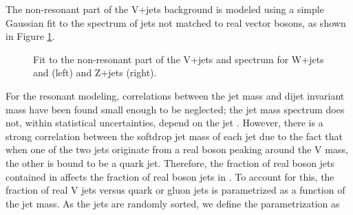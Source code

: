 The non-resonant part of the V+jets background is modeled using a simple Gaussian fit to the spectrum of jets not matched to real vector bosons, as shown in Figure \ref{fig:Vjets_fits_nonRes}.
\begin{figure}[h!]
\centering
{}
\caption{Fit to the non-resonant part of the V+jets and \ttbar spectrum for W+jets and \ttbar (left) and Z+jets (right).}
\label{fig:Vjets_fits_nonRes}
\end{figure}
For the resonant modeling, correlations between the jet mass \MJ and dijet invariant mass \MVV have been found small enough to be neglected; the jet mass spectrum does not, within statistical uncertainties, depend on the jet \PT. However, there is a strong correlation between the softdrop jet mass of each jet due to the fact that when one of the two jets originate from a real boson peaking around the V mass, the other is bound to be a quark jet. Therefore, the fraction of real boson jets contained in \MJO affects the fraction of real boson jets in \MJT. To account for this, the fraction of real V jets versus quark or gluon jets is parametrized as a function of the jet mass. As the jets are randomly sorted, we define the parametrization as
